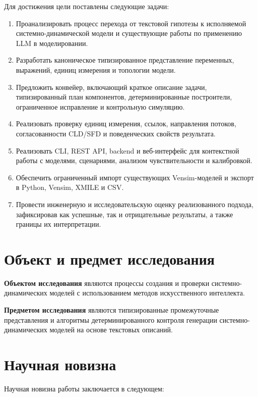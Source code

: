 Для достижения цели поставлены следующие задачи:

\begin{enumerate}
    \item Проанализировать процесс перехода от текстовой гипотезы к исполняемой системно-динамической модели и существующие работы по применению LLM в моделировании.
    \item Разработать каноническое типизированное представление переменных, выражений, единиц измерения и топологии модели.
    \item Предложить конвейер, включающий краткое описание задачи, типизированный план компонентов, детерминированные построители, ограниченное исправление и контрольную симуляцию.
    \item Реализовать проверку единиц измерения, ссылок, направления потоков, согласованности CLD/SFD и поведенческих свойств результата.
    \item Реализовать CLI, REST API, backend и веб-интерфейс для контекстной работы с моделями, сценариями, анализом чувствительности и калибровкой.
    \item Обеспечить ограниченный импорт существующих Vensim-моделей и экспорт в Python, Vensim, XMILE и CSV.
    \item Провести инженерную и исследовательскую оценку реализованного подхода, зафиксировав как успешные, так и отрицательные результаты, а также границы их интерпретации.
\end{enumerate}

\section*{Объект и предмет исследования}

\textbf{Объектом исследования} являются процессы создания и проверки системно-динамических моделей с использованием методов искусственного интеллекта.

\textbf{Предметом исследования} являются типизированные промежуточные представления и алгоритмы детерминированного контроля генерации системно-динамических моделей на основе текстовых описаний.

\section*{Научная новизна}

Научная новизна работы заключается в следующем:

